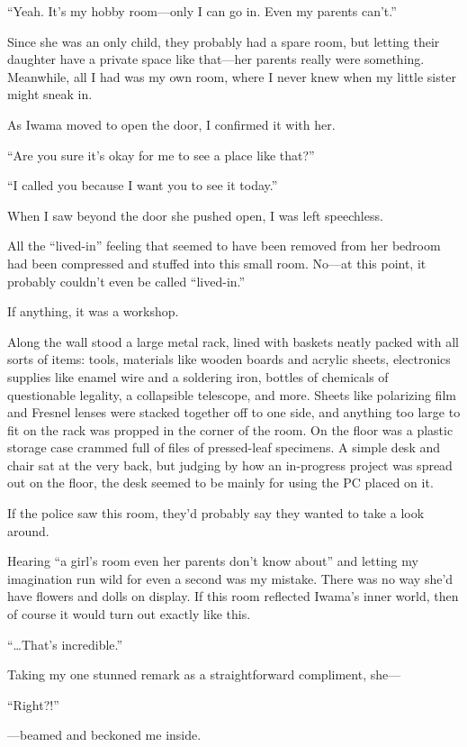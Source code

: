\documentclass[
    a4paper,
    12pt,
    twoside,
    openany,
    UTF8,
    fontset=windows
]{ctexbook}
\begin{document}
``Yeah. It's my hobby room---only I can go in. Even my parents can't.''

Since she was an only child, they probably had a spare room, but letting their daughter have a private space like that---her parents really were something. Meanwhile, all I had was my own room, where I never knew when my little sister might sneak in.

As Iwama moved to open the door, I confirmed it with her.

``Are you sure it's okay for me to see a place like that?''

``I called you because I want you to see it today.''

When I saw beyond the door she pushed open, I was left speechless.

All the ``lived-in'' feeling that seemed to have been removed from her bedroom had been compressed and stuffed into this small room. No---at this point, it probably couldn't even be called ``lived-in.''

If anything, it was a workshop.

Along the wall stood a large metal rack, lined with baskets neatly packed with all sorts of items: tools, materials like wooden boards and acrylic sheets, electronics supplies like enamel wire and a soldering iron, bottles of chemicals of questionable legality, a collapsible telescope, and more. Sheets like polarizing film and Fresnel lenses were stacked together off to one side, and anything too large to fit on the rack was propped in the corner of the room. On the floor was a plastic storage case crammed full of files of pressed-leaf specimens. A simple desk and chair sat at the very back, but judging by how an in-progress project was spread out on the floor, the desk seemed to be mainly for using the PC placed on it.

If the police saw this room, they'd probably say they wanted to take a look around.

Hearing ``a girl's room even her parents don't know about'' and letting my imagination run wild for even a second was my mistake. There was no way she'd have flowers and dolls on display. If this room reflected Iwama's inner world, then of course it would turn out exactly like this.

``\dots That's incredible.''

Taking my one stunned remark as a straightforward compliment, she---

``Right?!''

---beamed and beckoned me inside.
\end{document}
